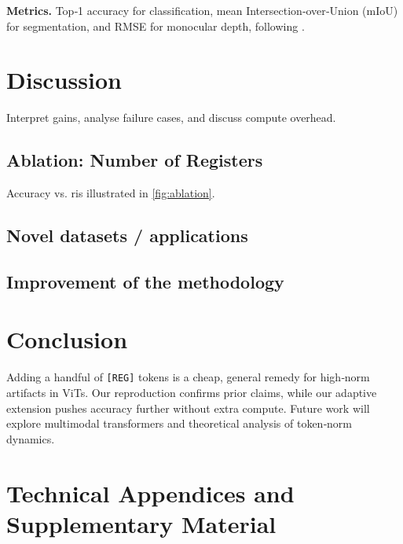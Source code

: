 \documentclass{article}
\newcommand{\RegTok}{\texttt{[REG]}\xspace}
\newcommand{\nreg}{r}
\begin{document}
\textbf{Metrics.}  Top‑1 accuracy for classification, mean Intersection‑over‑Union (mIoU) for segmentation, and RMSE for monocular depth, following \cite{darcetVisionTransformersNeed2024}.

\section{Discussion}
\label{sec:discussion}
Interpret gains, analyse failure cases, and discuss compute overhead.

\subsection{Ablation: Number of Registers}
Accuracy vs. \nreg is illustrated in \cref{fig:ablation}.

\subsection{Novel datasets / applications} \label{sec:novel_datasets}

\subsection{Improvement of the methodology} \label{sec:improvement}

\section{Conclusion}
Adding a handful of \RegTok tokens is a cheap, general remedy for high‑norm artifacts in ViTs.  Our reproduction confirms prior claims, while our adaptive extension pushes accuracy further without extra compute.  Future work will explore multimodal transformers and theoretical analysis of token‑norm dynamics.

\printbibliography


\appendix

\section{Technical Appendices and Supplementary Material}

\end{document}
